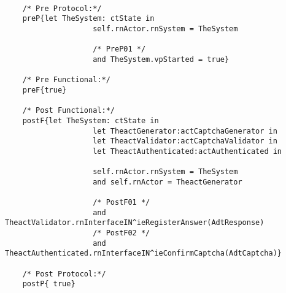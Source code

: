 	\scriptsize
	\vspace{0.5cm}
	\begin{lstlisting}[style=MessirStyle,firstnumber=auto,captionpos=b,caption={\msrmessir (MCL-oriented) specification of the operation \emph{oeSendCaptcha}.},label=OM-actCaptchaGenerator-oeSendCaptcha-MCL-LST]

	/* Pre Protocol:*/ 
	preP{let TheSystem: ctState in
					self.rnActor.rnSystem = TheSystem
	  
					/* PreP01 */
					and TheSystem.vpStarted = true}
	
	/* Pre Functional:*/
	preF{true}
	
	/* Post Functional:*/ 
	postF{let TheSystem: ctState in
					let TheactGenerator:actCaptchaGenerator in
					let TheactValidator:actCaptchaValidator in
					let TheactAuthenticated:actAuthenticated in
					
					self.rnActor.rnSystem = TheSystem
					and self.rnActor = TheactGenerator
					
					/* PostF01 */
					and TheactValidator.rnInterfaceIN^ieRegisterAnswer(AdtResponse)
					/* PostF02 */
					and TheactAuthenticated.rnInterfaceIN^ieConfirmCaptcha(AdtCaptcha)}
	
	/* Post Protocol:*/ 
	postP{ true}
	
	\end{lstlisting}
	\normalsize 
	
	
	
	





